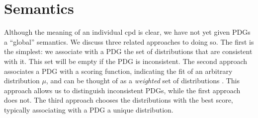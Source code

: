 \documentclass[letterpaper]{article} %
\theoremstyle{plain}
\theoremstyle{definition}
\theoremstyle{remark}
\begin{document}
\section{Semantics}\label{sec:semantics}
Although the meaning of an individual cpd is clear, we have not yet given 
PDGs a ``global'' semantics. We discuss three related approaches to doing so.
The first is the simplest: we associate with a PDG the set of distributions that
are consistent with it. This set will be empty if the PDG is inconsistent.
%
The second approach associates a PDG with a scoring function, indicating the fit
of an arbitrary distribution $\mu$, and can be thought of as a \emph{weighted}
set of distributions \cite{HL12}. This approach allows us to distinguish
inconsistent PDGs, while the first approach does not. The third approach chooses
the distributions with the best score, typically associating with a PDG a unique
distribution.
\end{document}
